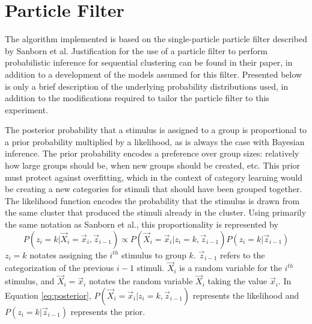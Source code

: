 \section{Particle Filter}
\label{sec:filter}
The algorithm implemented is based on the single-particle particle filter
described by Sanborn et al.\cite{sanborn2010} Justification for the use of a
particle filter to perform probabilistic inference for sequential clustering can
be found in their paper, in addition to a development of the models assumed for
this filter. Presented below is only a brief description of the underlying
probability distributions used, in addition to the modifications required to
tailor the particle filter to this experiment.

The posterior probability that a stimulus is assigned to a group is proportional
to a prior probability multiplied by a likelihood, as is always the case with
Bayesian inference. The prior probability encodes a preference over group sizes:
relatively how large groups should be, when new groups should be created, etc.
This prior must protect against overfitting, which in the context of category
learning would be creating a new categories for stimuli that should have been
grouped together. The likelihood function encodes the probability that the stimulus is drawn from
the same cluster that produced the stimuli already in the cluster. Using
primarily the same notation as Sanborn et al., this proportionality is represented by
\begin{equation}
P(z_i = k | \vec{X}_i = \vec{x}_i,  \vec{z}_{i-1}) \propto  P(\vec{X}_i =
\vec{x}_i | z_i = k,  \vec{z}_{i-1}) P(z_i = k | \vec{z}_{i-1})
\label{eq:posterior}
\end{equation}
$z_i = k$ notates assigning the $i^{th}$ stimulus to group $k$. $\vec{z}_{i-1}$ refers to
the categorization of the previous $i - 1$ stimuli. $\vec{X}_i$ is a random
variable for the $i^{th}$ stimulus, and $\vec{X}_i = \vec{x}_i$ notates the
random variable $\vec{X}_i$ taking the value $\vec{x}_i$. 
In Equation \ref{eq:posterior}, $P(\vec{X}_i =
\vec{x}_i | z_i = k,  \vec{z}_{i-1})$ represents the likelihood and $P(z_i = k |
\vec{z}_{i-1})$ represents the prior.

